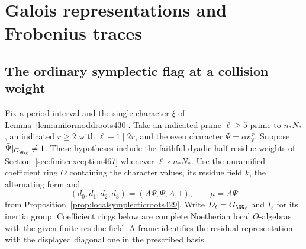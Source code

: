 \documentclass[a4paper,11pt]{article}
\theoremstyle{definition}
\theoremstyle{remark}
\numberwithin{equation}{section}
\begin{document}
\section{Galois representations and Frobenius traces}\label{nav:chapter-galois-strict-frobenius}

\subsection{The ordinary symplectic flag at a collision weight}
\label{sec:sympflag468}

Fix a period interval and the single character \(\xi\) of
Lemma~\ref{lem:uniformoddroots430}. Take an indicated prime
\(\ell\ge5\) prime to \(n_*N_*\), an indicated \(r\ge2\) with
\(\ell-1\mid2r\), and the even character \(\Psi=\alpha\kappa_\ell^r\).
Suppose \(\bar\Psi|_{G_{\QQ_\ell}}\ne1\). These hypotheses include
the faithful dyadic half-residue weights of
Section~\ref{sec:finiteexception467} whenever \(\ell\nmid n_*N_*\).
Use the unramified coefficient ring \(O\) containing the character
values, its residue field \(k\), the alternating form and
\[
  (d_0,d_1,d_2,d_3)=(A\Psi,\Psi,A,1),\qquad \mu=A\Psi
\]
from Proposition~\ref{prop:localsymplecticroots429}.
Write \(D_\ell=G_{\QQ_\ell}\) and \(I_\ell\) for its inertia group.
Coefficient rings below are complete Noetherian local \(O\)-algebras
with the given finite residue field. A frame identifies the residual
representation with the displayed diagonal one in the prescribed basis.
\end{document}
